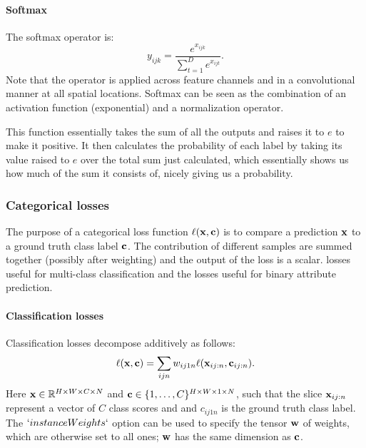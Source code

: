 \paragraph{Softmax}\label{s:softmax}

The softmax operator is:
\[
y_{ijk} = \frac{e^{x_{ijk}}}{\sum_{t=1}^D e^{x_{ijt}}}.
\]
Note that the operator is applied across feature channels and in a convolutional manner at all spatial locations. Softmax can be seen as the combination of an activation function (exponential) and a normalization operator. 

This function essentially takes the sum of all the outputs and raises it to $e$ to make it positive. It then calculates the probability of each label by taking its value raised to $e$ over the total sum just calculated, which essentially shows us how much of the sum it consists of, nicely giving us a probability.


\subsubsection{Categorical losses}\label{s:losses}

The purpose of a categorical loss function $\ell(\mathbf{x},\mathbf{c})$ is to compare a prediction $\mathbf{x}$ to a ground truth class label $\mathbf{c}$. The contribution of different samples are summed together (possibly after weighting) and the output of the loss is a scalar.  losses useful for multi-class classification and the  losses useful for binary attribute prediction. 

\paragraph{Classification losses}\label{s:loss-classification}

Classification losses decompose additively as follows:
\begin{equation}\label{e:addloss}
\ell(\mathbf{x},\mathbf{c}) = \sum_{ijn} w_{ij1n} \ell(\mathbf{x}_{ij:n}, \mathbf{c}_{ij:n}).
\end{equation}
Here $\mathbf{x} \in \mathbb{R}^{H \times W \times C \times N}$ and $\mathbf{c} \in \{1, \dots, C\}^{H \times W \times 1 \times N}$, such that the slice $\mathbf{x}_{ij:n}$ represent a vector of $C$ class scores and and $c_{ij1n}$ is the ground truth class label. The $`instanceWeights`$ option can be used to specify the tensor $\mathbf{w}$ of weights, which are otherwise set to all ones; $\mathbf{w}$ has the same dimension as $\mathbf{c}$.

